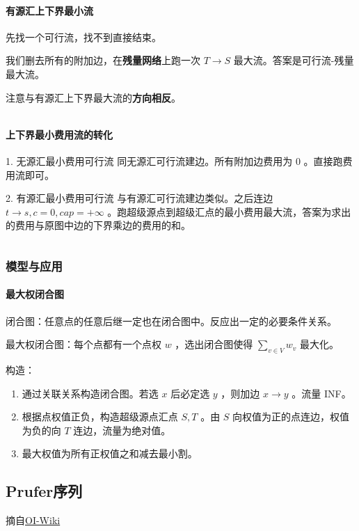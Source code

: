 \documentclass[a4paper,11pt]{article}
\begin{document}
\paragraph{有源汇上下界最小流}
先找一个可行流，找不到直接结束。

我们删去所有的附加边，在\textbf{残量网络}上跑一次 \(T\to S\)
最大流。答案是可行流-残量最大流。

注意与有源汇上下界最大流的\textbf{方向相反}。
\inputminted[linenos]{c++}{graph/updownminflow.cpp}

\paragraph{上下界最小费用流的转化}

1. 无源汇最小费用可行流
同无源汇可行流建边。所有附加边费用为 \(0\) 。直接跑费用流即可。

2. 有源汇最小费用可行流
与有源汇可行流建边类似。之后连边 \(t\to s, c = 0 ,cap = +\infty \) 。跑超级源点到超级汇点的最小费用最大流，答案为求出的费用与原图中边的下界乘边的费用的和。
\inputminted[linenos]{c++}{graph/updownavimincost.cpp}


\subsubsection{模型与应用}

\paragraph{最大权闭合图}

闭合图：任意点的任意后继一定也在闭合图中。反应出一定的必要条件关系。

最大权闭合图：每个点都有一个点权 \(w\) ，选出闭合图使得 \(\sum_{v\in V}w_v\) 最大化。

构造：
\begin{enumerate}
\item 通过关联关系构造闭合图。若选 \(x\) 后必定选 \(y\) ，则加边 \(x\to y\) 。流量 INF。
\item 根据点权值正负，构造超级源点汇点 \(S,T\) 。由 \(S\) 向权值为正的点连边，权值为负的向 \(T\) 连边，流量为绝对值。
\item 最大权值为所有正权值之和减去最小割。
\end{enumerate}

\subsection{Prufer序列}
摘自\href{https://oi-wiki.org/graph/prufer}{OI-Wiki}
\end{document}
